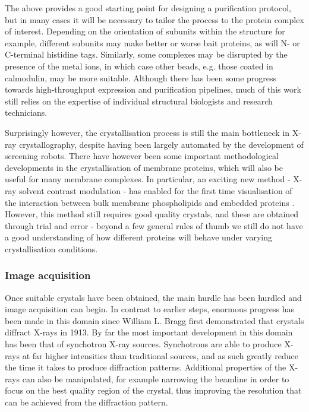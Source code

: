 \documentclass[a4paper,11pt,twoside,openright]{scrbook}
\let\cite\supercite
\begin{document}
The above provides a good starting point for designing a purification protocol, but in many cases it will be necessary to tailor the process to the protein complex of interest. Depending on the orientation of subunits within the structure for example, different subunits may make better or worse bait proteins, as will N- or C-terminal histidine tags. Similarly, some complexes may be disrupted by the presence of the metal ions, in which case other beads, e.g. those coated in calmodulin, may be more suitable. Although there has been some progress towards high-throughput expression and purification pipelines, much of this work still relies on the expertise of individual structural biologists and research technicians.

Surprisingly however, the crystallisation process is still the main bottleneck in X-ray crystallography, despite having been largely automated by the development of screening robots. There have however been some important methodological developments in the crystallisation of membrane proteins, which will also be useful for many membrane complexes. In particular, an exciting new method - X-ray solvent contrast modulation - has enabled for the first time visualisation of the interaction between bulk membrane phospholipids and embedded proteins \cite{Norimatsu2017}. However, this method still requires good quality crystals, and these are obtained through trial and error - beyond a few general rules of thumb we still do not have a good understanding of how different proteins will behave under varying crystallisation conditions.



\subsubsection{Image acquisition}
Once suitable crystals have been obtained, the main hurdle has been hurdled and image acquisition can begin. In contrast to earlier steps, enormous progress has been made in this domain since William L. Bragg first demonstrated that crystals diffract X-rays in 1913. By far the most important development in this domain has been that of synchotron X-ray sources. Synchotrons are able to produce X-rays at far higher intensities than traditional sources, and as such greatly reduce the time it takes to produce diffraction patterns. Additional properties of the X-rays can also be manipulated, for example narrowing the beamline in order to focus on the best quality region of the crystal, thus improving the resolution that can be achieved from the diffraction pattern.
\end{document}
